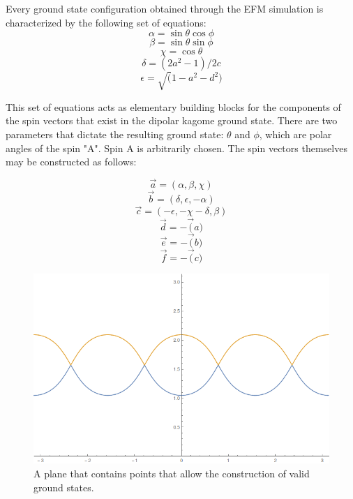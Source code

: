 \clearpage
Every ground state configuration obtained through the EFM simulation is characterized by the following set of equations:
\begin{equation}
\label{eqn:rel_a}
\alpha = \sin{\theta} \cos{\phi}
\end{equation}
\begin{equation}
\label{eqn:rel_b}
\beta = \sin{\theta} \sin{\phi}
\end{equation}
\begin{equation}
\label{eqn:rel_c}
\chi = \cos{\theta}
\end{equation}
\begin{equation}
\label{eqn:rel_d}
\delta = (2a^2-1)/2c
\end{equation}
\begin{equation}
\label{eqn:rel_e}
\epsilon = \sqrt(1-a^2-d^2)
\end{equation}

This set of equations acts as elementary building blocks for the components of the spin vectors that exist in the dipolar kagome ground state. There are two parameters that dictate the resulting ground state: $\theta$ and $\phi$, which are polar angles of the spin "A". Spin A is arbitrarily chosen. The spin vectors themselves may be constructed as follows:

$$\overrightarrow{a} = (\alpha, \beta, \chi)$$
$$\overrightarrow{b} = (\delta, \epsilon, -\alpha)$$
$$\overrightarrow{c} = (-\epsilon, -\chi-\delta, \beta)$$
$$\overrightarrow{d} =-\overrightarrow(a)$$
$$\overrightarrow{e} =-\overrightarrow(b)$$
$$\overrightarrow{f} =-\overrightarrow(c)$$

\begin{figure}
	\includegraphics[width=\linewidth]{img/degeneracyplanefull.png}
	\caption{A plane that contains points that allow the construction of valid ground states.}
	\label{fig:degenplanefull}
\end{figure}



